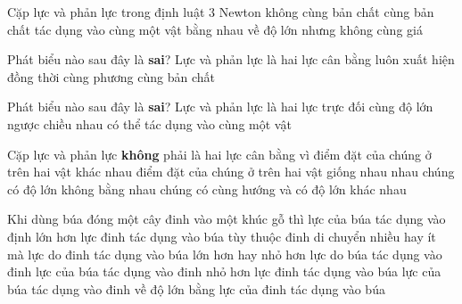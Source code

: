 \begin{ex}%
Cặp lực và phản lực trong định luật $3$ Newton
\choice
{không cùng bản chất}
{\True cùng bản chất}
{tác dụng vào cùng một vật}
{bằng nhau về độ lớn nhưng không cùng giá}
 \end{ex}
\begin{ex}%
Phát biểu nào sau đây là \textbf{sai}? Lực và phản lực
\choice
{\True là hai lực cân bằng}
{luôn xuất hiện đồng thời}
{cùng phương}
{cùng bản chất}
 \end{ex}
\begin{ex}%
Phát biểu nào sau đây là \textbf{sai}? Lực và phản lực
\choice
{là hai lực trực đối}
{cùng độ lớn}
{ngược chiều nhau}
{\True có thể tác dụng vào cùng một vật}
 \end{ex}

\begin{ex}%
Cặp lực và phản lực \textbf{không} phải là hai lực cân bằng vì
\choice
{\True điểm đặt của chúng ở trên hai vật khác nhau}
{điểm đặt của chúng ở trên hai vật giống nhau nhau}
{chúng có độ lớn không bằng nhau}
{chúng có cùng hướng và có độ lớn khác nhau}
\end{ex}
\begin{ex}%
Khi dùng búa đóng một cây đinh vào một khúc gỗ thì
\choice
{lực của búa tác dụng vào định lớn hơn lực đinh tác dụng vào búa}
{tùy thuộc đinh di chuyển nhiều hay ít mà lực do đinh tác dụng vào búa lớn hơn hay nhỏ hơn lực do búa tác dụng vào đinh}
{lực của búa tác dụng vào đinh nhỏ hơn lực đinh tác dụng vào búa}
{\True lực của búa tác dụng vào đinh về độ lớn bằng lực của đinh tác dụng vào búa}
 \end{ex}

